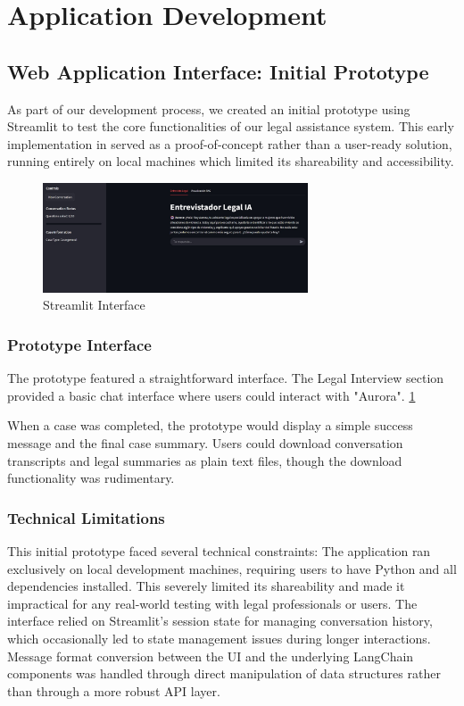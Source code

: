 \section{Application Development}

\subsection{Web Application Interface: Initial Prototype}
\label{sec:web-interface}

As part of our development process, we created an initial prototype using Streamlit to test the core functionalities of our legal 
assistance system. This early implementation in served as a proof-of-concept rather than a user-ready solution, 
running entirely on local machines which limited its shareability and accessibility.

\begin{figure}[htbp]
    \centering
    \includegraphics[width=0.7\textwidth]{figures/streamlit.jpeg}
    \caption{Streamlit Interface}
    \label{fig:streamlit}
\end{figure}

\subsubsection{Prototype Interface}
The prototype featured a straightforward interface. 
The Legal Interview section provided a basic chat interface where users could interact with "Aurora". \ref{fig:streamlit}

When a case was completed, the prototype would display a simple success message and the final case summary. 
Users could download conversation transcripts and legal summaries as plain text files, though the download functionality was rudimentary.

\subsubsection{Technical Limitations}

This initial prototype faced several technical constraints:
The application ran exclusively on local development machines, requiring users to have Python and all dependencies installed. 
This severely limited its shareability and made it impractical for any real-world testing with legal professionals or users.
The interface relied on Streamlit's session state for managing conversation history, which occasionally led to state management 
issues during longer interactions. Message format conversion between the UI and the underlying LangChain components was handled 
through direct manipulation of data structures rather than through a more robust API layer.

